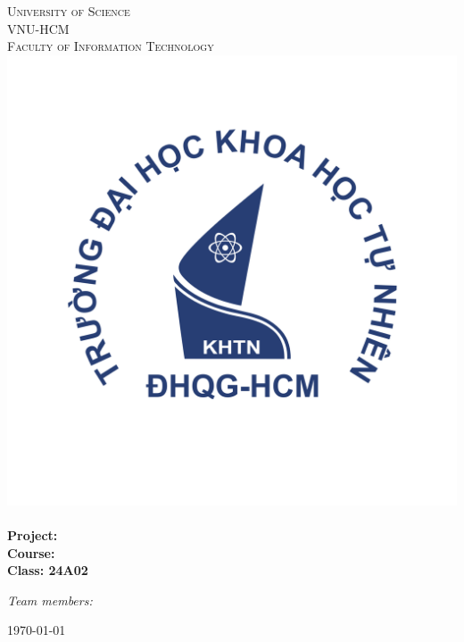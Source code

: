 \begin{titlepage}
\newcommand{\HRule}{\rule{\linewidth}{0.5mm}}
\centering

\textsc{\LARGE University of Science}\\[0.5cm]
\textsc{\Large VNU-HCM }\\[0.4cm]
\textsc{\large Faculty of Information Technology}\\[0.4cm]
\includegraphics[scale=.35]{img/hcmus-logo.png}\\[1cm] 

\huge{\bfseries{\reporttitle}}\\[0.5cm]
\large{\bfseries{Project: \reportname}}
\\[0.4cm]

\textbf{\large Course: \coursename}\\[0.5cm]
\textbf{\large Class: 24A02}\\[0.5cm]
\begin{minipage}[t]{0.4\textwidth}
\begin{flushleft} \large
\emph{Team members:}\\
\studentname
\end{flushleft}
\end{minipage}
{\large \today}\\[1cm]

\vfill
\end{titlepage}
	